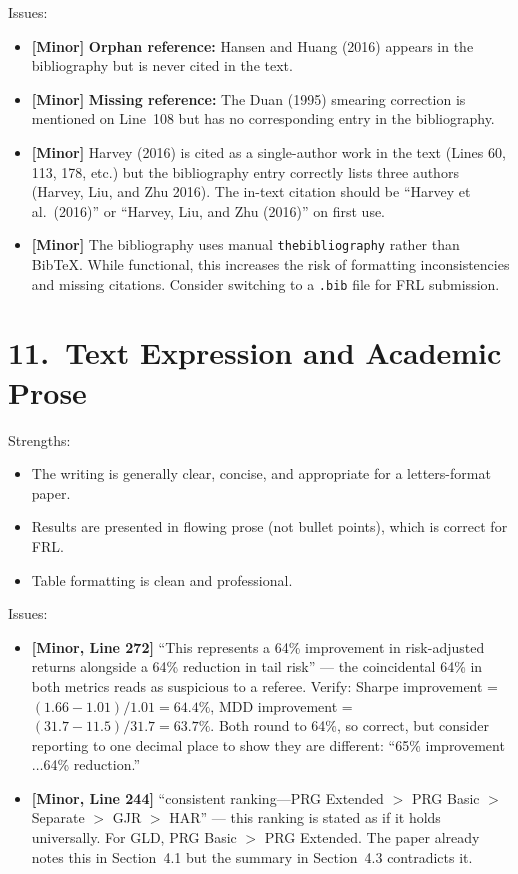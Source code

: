 \documentclass[12pt,a4paper]{article}
\begin{document}
\noindent Issues:
\begin{itemize}[nosep]
\item [L6] \textbf{[Minor]} \textbf{Orphan reference:} Hansen and Huang (2016) appears in the bibliography but is never cited in the text.
\item [L7] \textbf{[Minor]} \textbf{Missing reference:} The Duan (1995) smearing correction is mentioned on Line~108 but has no corresponding entry in the bibliography.
\item [L8] \textbf{[Minor]} Harvey (2016) is cited as a single-author work in the text (Lines 60, 113, 178, etc.) but the bibliography entry correctly lists three authors (Harvey, Liu, and Zhu 2016). The in-text citation should be ``Harvey et al.\ (2016)'' or ``Harvey, Liu, and Zhu (2016)'' on first use.
\item [L9] \textbf{[Minor]} The bibliography uses manual \texttt{thebibliography} rather than BibTeX. While functional, this increases the risk of formatting inconsistencies and missing citations. Consider switching to a \texttt{.bib} file for FRL submission.
\end{itemize}

\bigskip

\section*{11.\ Text Expression and Academic Prose}

\noindent \textcolor{okgreen}{Strengths:}
\begin{itemize}[nosep]
\item The writing is generally clear, concise, and appropriate for a letters-format paper.
\item Results are presented in flowing prose (not bullet points), which is correct for FRL.
\item Table formatting is clean and professional.
\end{itemize}

\noindent Issues:
\begin{itemize}[nosep]
\item [L10] \textbf{[Minor, Line 272]} ``This represents a 64\% improvement in risk-adjusted returns alongside a 64\% reduction in tail risk'' --- the coincidental 64\% in both metrics reads as suspicious to a referee. Verify: Sharpe improvement = $(1.66-1.01)/1.01 = 64.4\%$, MDD improvement = $(31.7-11.5)/31.7 = 63.7\%$. Both round to 64\%, so correct, but consider reporting to one decimal place to show they are different: ``65\% improvement$\ldots$64\% reduction.''
\item [L11] \textbf{[Minor, Line 244]} ``consistent ranking---PRG Extended $>$ PRG Basic $>$ Separate $>$ GJR $>$ HAR'' --- this ranking is stated as if it holds universally. For GLD, PRG Basic $>$ PRG Extended. The paper already notes this in Section~4.1 but the summary in Section~4.3 contradicts it.
\end{itemize}
\end{document}
